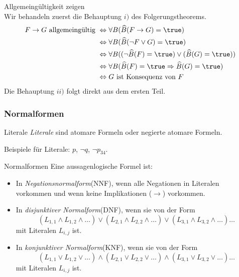 \begin{howto}{Allgemeingültigkeit zeigen}\\
    Wir behandeln zuerst die Behauptung $i)$ des Folgerungstheorems.
    \begin{align*}
        F\to G\text{ allgemeingültig } &\Leftrightarrow \forall B(\widehat{B}(F\to G) =\true)\\
        &\Leftrightarrow \forall B(\widehat{B}(\neg F\lor G) =\true)\\
        &\Leftrightarrow \forall B((\neg \widehat{B}(F)=\true) \lor (\widehat{B}(G) =\true))\\
        &\Leftrightarrow \forall B(\widehat{B}(F)=\true\Rightarrow \widehat{B}(G)=\true)\\
        &\Leftrightarrow G\text{ ist Konsequenz von }F
    \end{align*}
    Die Behauptung $ii)$ folgt direkt aus dem ersten Teil.
\end{howto}

\subsubsection{Normalformen}

\begin{definition}{Literale}
    \textit{Literale} sind atomare Formeln oder negierte atomare Formeln.
\end{definition}

\begin{example}
    Beispiele für Literale: $p$, $\neg q$, $\neg p_{34}$.
\end{example}

\begin{concept}{Normalformen}
    Eine aussagenlogische Formel ist:
    \begin{itemize}
        \item In \textit{Negationsnormalform}(NNF), wenn alle Negationen in Literalen vorkommen und wenn keine Implikationen ($\to$) vorkommen.
        \item In \textit{disjunktiver Normalform}(DNF), wenn sie von der Form
            \[
                (L_{1,1}\land L_{1,2}\land\dots)\lor(L_{2,1}\land L_{2,2}\land\dots)\lor(L_{3,1}\land L_{3,2}\land\dots)\dots
            \]
            mit Literalen $L_{i,j}$ ist.
        \item In \textit{konjunktiver Normalform}(KNF), wenn sie von der Form
            \[
                (L_{1,1}\lor L_{1,2}\lor\dots)\land(L_{2,1}\lor L_{2,2}\lor\dots)\land(L_{3,1}\lor L_{3,2}\lor\dots)\dots
            \]
            mit Literalen $L_{i,j}$ ist.
    \end{itemize}
\end{concept}

